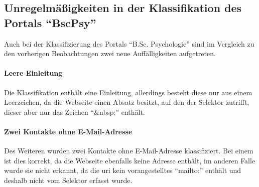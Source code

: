 \subsection{Unregelmäßigkeiten in der Klassifikation des Portals "`BscPsy"'}
    Auch bei der Klassifizierung des Portals "`B.Sc. Psychologie"'
    sind im Vergleich zu den vorherigen Beobachtungen zwei neue
    Auffälligkeiten aufgetreten.

    \paragraph{Leere Einleitung}
        Die Klassifikation enthält eine Einleitung,
        allerdings besteht diese nur aus einem Leerzeichen,
        da die Webseite einen Absatz besitzt,
        auf den der Selektor zutrifft,
        dieser aber nur das Zeichen "`\&nbsp;"' enthält.

    \paragraph{Zwei Kontakte ohne E-Mail-Adresse}
        Des Weiteren wurden zwei Kontakte ohne E-Mail-Adresse klassifiziert.
        Bei einem ist dies korrekt, da die Webseite ebenfalls keine Adresse enthält,
        im anderen Falle wurde sie nicht erkannt,
        da die \gls{uri} kein vorangestelltes "`mailto:"' enthält
        und deshalb nicht vom Selektor erfasst wurde.
